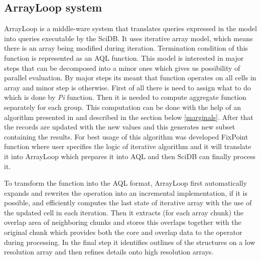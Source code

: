 \subsection{ArrayLoop system}
ArrayLoop is a middle-ware system that translates queries expressed in the model into queries executable by the SciDB. It uses iterative array model, which means there is an array being modified during iteration. Termination condition of this function is represented as an AQL function. This model is interested in major steps that can be decomposed into a minor ones which gives us possibility of parallel evaluation. By major steps its meant that function operates on all cells in array and minor step is otherwise. First of all there is need to assign what to do which is done by \textit{Pi} function. Then it is needed to compute aggregate function separately for each group.  This computation can be done with the help of an algorithm presented in \cite{marginals} and described in the section below \ref{marginals}. After that the records are updated with the new values and this generates new subset containing the results.
For best usage of this algorithm was developed FixPoint function where user specifies the logic of iterative algorithm and it will translate it into ArrayLoop which prepares it into AQL and then SciDB can finally process it.

To transform the function into the AQL format, ArrayLoop first automatically expands and rewrites the operation into an incremental implementation, if it is possible, and efficiently computes the last state of iterative array with the use of the updated cell in each iteration. Then it extracts (for each array chunk) the overlap area of neighboring chunks and stores this overlaps together with the original chunk which provides both the core and overlap data to the operator during processing. In the final step it identifies outlines of the structures on a low resolution array and then refines details onto high resolution arrays. \cite{arrayloop}

